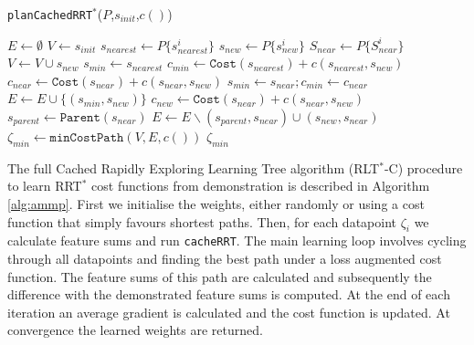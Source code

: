 \documentclass{article}  %
\begin{document}
	\begin{algorithm}
	\caption{\texttt{planCachedRRT$^*$}($P$,$s_{init}$,$c()$)}
	 \label{alg:plan_cached}
	\begin{algorithmic}[1]
	\STATE $E \gets \emptyset$
	\STATE $V \gets {s_{init}}$
	\STATE $s_{nearest} \gets P\{s_{nearest}^i\}$
	\STATE $s_{new} \gets P\{s_{new}^i\}$
	\STATE $S_{near} \gets P\{S_{near}^i\}$
	\STATE $V\gets V \cup s_{new}$
	\STATE $s_{min}\gets s_{nearest}$
	\STATE $c_{min}\gets \texttt{Cost}(s_{nearest}) + c(s_{nearest},s_{new})$
	\STATE $c_{near} \gets \texttt{Cost}(s_{near}) + c(s_{near},s_{new})$
	\STATE $s_{min} \gets s_{near}; c_{min}\gets c_{near}$
	\ENDIF
	\ENDFOR
	\STATE $E \gets E \cup \{(s_{min},s_{new})\} $
	\STATE $c_{new} \gets \texttt{Cost}(s_{near}) + c(s_{near},s_{new})$
	\STATE $s_{parent} \gets \texttt{Parent}(s_{near})$
	\STATE $E \gets E  \smallsetminus {(s_{parent},s_{near})} \cup {(s_{new},s_{near})} $
	\ENDIF
	\ENDFOR
	\ENDFOR
	\STATE $\zeta_{min} \gets \texttt{minCostPath}(V,E,c())$
	\RETURN $\zeta_{min}$

	\end{algorithmic}
	\end{algorithm}

	The full Cached Rapidly Exploring Learning Tree algorithm (RLT$^*$-C) procedure to learn RRT$^*$ cost functions from demonstration is described in Algorithm \ref{alg:ammp}. First we initialise the weights, either randomly or using a cost function that simply favours shortest paths. Then, for each datapoint $\zeta_i$ we calculate feature sums and run \texttt{cacheRRT}. The main learning loop involves cycling through all datapoints and finding the best path under a loss augmented cost function. The feature sums of this path are calculated and subsequently the difference with the demonstrated feature sums is computed. At the end of each iteration an average gradient is calculated and the cost function is updated. At convergence the learned weights are returned.
\end{document}
